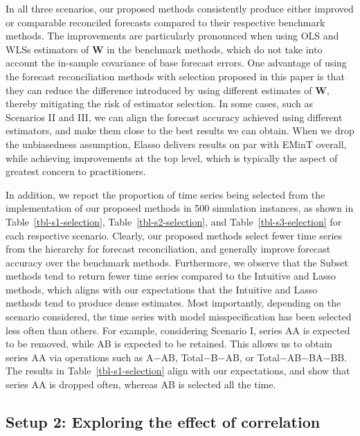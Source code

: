 \documentclass[
  12pt,
  11pt]{article}
\begin{document}
In all three scenarios, our proposed methods consistently produce either
improved or comparable reconciled forecasts compared to their respective
benchmark methods. The improvements are particularly pronounced when
using OLS and WLSs estimators of \(\bm{W}\) in the benchmark methods,
which do not take into account the in-sample covariance of base forecast
errors. One advantage of using the forecast reconciliation methods with
selection proposed in this paper is that they can reduce the difference
introduced by using different estimates of \(\bm{W}\), thereby
mitigating the risk of estimator selection. In some cases, such as
Scenarios II and III, we can align the forecast accuracy achieved using
different estimators, and make them close to the best results we can
obtain. When we drop the unbiasedness assumption, Elasso delivers
results on par with EMinT overall, while achieving improvements at the
top level, which is typically the aspect of greatest concern to
practitioners.

In addition, we report the proportion of time series being selected from
the implementation of our proposed methods in 500 simulation instances,
as shown in Table~\ref{tbl-s1-selection}, Table~\ref{tbl-s2-selection},
and Table~\ref{tbl-s3-selection} for each respective scenario. Clearly,
our proposed methods select fewer time series from the hierarchy for
forecast reconciliation, and generally improve forecast accuracy over
the benchmark methods. Furthermore, we observe that the Subset methods
tend to return fewer time series compared to the Intuitive and Lasso
methods, which aligns with our expectations that the Intuitive and Lasso
methods tend to produce dense estimates. Most importantly, depending on
the scenario considered, the time series with model misspecification has
been selected less often than others. For example, considering Scenario
I, series AA is expected to be removed, while AB is expected to be
retained. This allows us to obtain series AA via operations such as
A\(-\)AB, Total\(-\)B\(-\)AB, or Total\(-\)AB\(-\)BA\(-\)BB. The results
in Table~\ref{tbl-s1-selection} align with our expectations, and show
that series AA is dropped often, whereas AB is selected all the time.

\hypertarget{sec-sim2}{%
\subsection{Setup 2: Exploring the effect of
correlation}\label{sec-sim2}}
\end{document}
